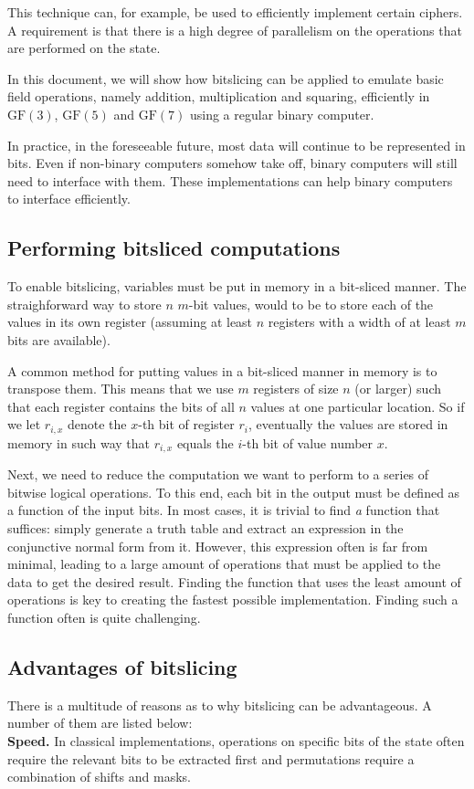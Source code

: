 \documentclass{report}
\newcommand{\GF}{\text{GF}}
\begin{document}
This technique can, for example, be used to efficiently implement certain ciphers. A requirement is that there is a high degree of parallelism on the operations that are performed on the state.
\newpage

In this document, we will show how bitslicing can be applied to emulate basic field operations, namely addition, multiplication and squaring, efficiently in $\GF(3)$, $\GF(5)$ and $\GF(7)$ using a regular binary computer.

In practice, in the foreseeable future, most data will continue to be represented in bits. Even if non-binary computers somehow take off, binary computers will still need to interface with them. These implementations can help binary computers to interface efficiently.

\subsection{Performing bitsliced computations}
To enable bitslicing, variables must be put in memory in a bit-sliced manner.
The straighforward way to store $n$ $m$-bit values, would to be to store each of the values in its own register (assuming at least $n$ registers with a width of at least $m$ bits are available).

A common method for putting values in a bit-sliced manner in memory is to transpose them. This means that we use $m$ registers of size $n$ (or larger) such that each register contains the bits of all $n$ values at one particular location. So if we let $r_{i,x}$ denote the $x$-th bit of register $r_i$, eventually the values are stored in memory in such way that $r_{i,x}$ equals the $i$-th bit of value number $x$.

Next, we need to reduce the computation we want to perform to a series of bitwise logical operations.
To this end, each bit in the output must be defined as a function of the input bits.
In most cases, it is trivial to find \emph{a} function that suffices: simply generate a truth table and extract an expression in the conjunctive normal form from it. 
However, this expression often is far from minimal, leading to a large amount of operations that must be applied to the data to get the desired result. Finding the function that uses the least amount of operations is key to creating the fastest possible implementation. Finding such a function often is quite challenging.

\subsection{Advantages of bitslicing}
There is a multitude of reasons as to why bitslicing can be advantageous.\cite{tabert2018bitslicing} A number of them are listed below:\\
\noindent\textbf{Speed.} In classical implementations, operations on specific bits of the state often require the relevant bits to be extracted first and permutations require a combination of shifts and masks.
\end{document}

